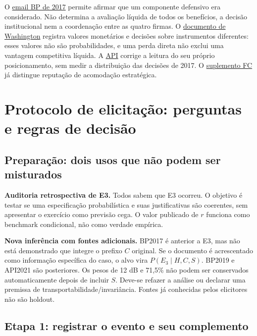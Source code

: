 \documentclass[
  brazilian,
  11pt,
  a4paper,
]{article}
\begin{document}
O
\href{https://oversightdemocrats.house.gov/imo/media/doc/a/bp-documents/BPA_HCOR_00052952.pdf}{email
BP de 2017} permite afirmar que um componente defensivo era considerado.
Não determina a avaliação líquida de todos os benefícios, a decisão
institucional nem a coordenação entre as quatro firmas. O
\href{https://oversightdemocrats.house.gov/imo/media/doc/a/bp-documents/BPA_HCOR_00278794.pdf}{documento
de Washington} registra valores monetários e decisões sobre instrumentos
diferentes: esses valores não são probabilidades, e uma perda direta não
exclui uma vantagem competitiva líquida. A
\href{https://www.api.org/~/media/files/news/2021/03/api-isf-on-carbon-pricing3_20_21}{API}
corrige a leitura do seu próprio posicionamento, sem medir a
distribuição das decisões de 2017. O
\href{https://static.cambridge.org/content/id/urn\%3Acambridge.org\%3Aid\%3Aarticle\%3AS2049847025000160/resource/name/S2049847025000160sup001.pdf}{suplemento
FC} já distingue reputação de acomodação estratégica.

\section{Protocolo de elicitação: perguntas e regras de
decisão}\label{protocolo-de-elicitauxe7uxe3o-perguntas-e-regras-de-decisuxe3o}

\subsection{Preparação: dois usos que não podem ser
misturados}\label{preparauxe7uxe3o-dois-usos-que-nuxe3o-podem-ser-misturados}

\textbf{Auditoria retrospectiva de E3.} Todos sabem que E3 ocorreu. O
objetivo é testar se uma especificação probabilística e suas
justificativas são coerentes, sem apresentar o exercício como previsão
cega. O valor publicado de \(r\) funciona como benchmark condicional,
não como verdade empírica.

\textbf{Nova inferência com fontes adicionais.} BP2017 é anterior a E3,
mas não está demonstrado que integre o prefixo \(C\) original. Se o
documento é acrescentado como informação específica do caso, o alvo vira
\(P(E_3\mid H,C,S)\). BP2019 e API2021 são posteriores. Os pesos de 12
dB e 71,5\% não podem ser conservados automaticamente depois de incluir
\(S\). Deve-se refazer a análise ou declarar uma premissa de
transportabilidade/invariância. Fontes já conhecidas pelos elicitores
não são holdout.

\subsection{Etapa 1: registrar o evento e seu
complemento}\label{etapa-1-registrar-o-evento-e-seu-complemento}
\end{document}
